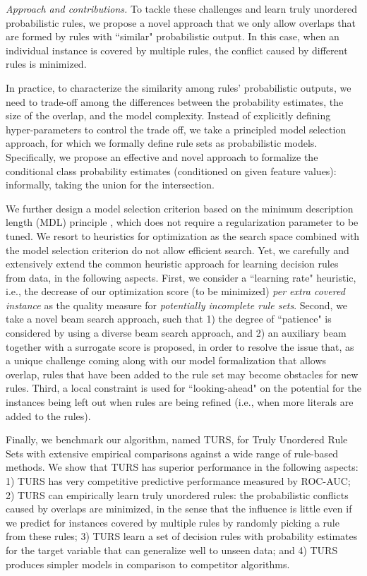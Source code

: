 \emph{Approach and contributions.}
To tackle these challenges and learn truly unordered probabilistic rules, we propose a novel approach that we only allow overlaps that are formed by rules with ``similar" probabilistic output. In this case, when an individual instance is covered by multiple rules, the conflict caused by different rules is minimized. 

In practice, to characterize the similarity among rules' probabilistic outputs, we need to trade-off among the differences between the probability estimates, the size of the overlap, and the model complexity. Instead of explicitly defining hyper-parameters to control the trade off, we take a principled model selection approach, for which we formally define rule sets as probabilistic models. Specifically, we propose an effective and novel approach to formalize the conditional class probability estimates (conditioned on given feature values): informally, taking the union for the intersection. 

We further design a model selection criterion based on the minimum description length (MDL) principle \citep{grunwald2019minimum}, which does not require a regularization parameter to be tuned. 
We resort to heuristics for optimization as the search space combined with the model selection criterion do not allow efficient search. Yet, we carefully and extensively extend the common heuristic approach for learning decision rules from data, in the following aspects. First, we consider a ``learning rate" heuristic, i.e., the decrease of our optimization score (to be minimized) \emph{per extra covered instance} as the quality measure for \emph{potentially incomplete rule sets}. Second, we take a novel beam search approach, such that 1) the degree of ``patience" is considered by using a diverse beam search approach, and 2) an auxiliary beam together with a surrogate score is proposed, in order to resolve the issue that, as a unique challenge coming along with our model formalization that allows overlap, rules that have been added to the rule set may become obstacles for new rules. 
Third, a local constraint is used for ``looking-ahead" on the potential for the instances being left out when rules are being refined (i.e., when more literals are added to the rules). 

Finally, we benchmark our algorithm, named TURS, for Truly Unordered Rule Sets with extensive empirical comparisons against a wide range of rule-based methods. We show that TURS has superior performance in the following aspects: 1) TURS has very competitive predictive performance measured by ROC-AUC; 2) TURS can empirically learn truly unordered rules: the probabilistic conflicts caused by overlaps are minimized, in the sense that the influence is little even if we predict for instances covered by multiple rules by randomly picking a rule from these rules; 3) TURS learn a set of decision rules with probability estimates for the target variable that can generalize well to unseen data; and 4) TURS produces simpler models in comparison to competitor algorithms. 

